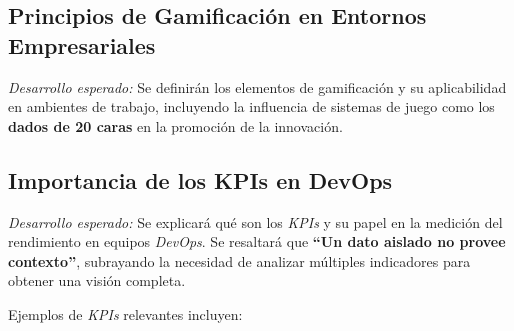 \documentclass[journal]{IEEEtran}
\begin{document}
\subsection{\textbf{Principios de Gamificación en Entornos Empresariales}}

\textit{Desarrollo esperado:} Se definirán los elementos de gamificación y su aplicabilidad en ambientes de trabajo, incluyendo la influencia de sistemas de juego como los \textbf{dados de 20 caras} en la promoción de la innovación.

\subsection{\textbf{Importancia de los KPIs en DevOps}}

\textit{Desarrollo esperado:} Se explicará qué son los \textit{KPIs} y su papel en la medición del rendimiento en equipos \textit{DevOps}. Se resaltará que \textbf{``Un dato aislado no provee contexto''}, subrayando la necesidad de analizar múltiples indicadores para obtener una visión completa.

Ejemplos de \textit{KPIs} relevantes incluyen:
\end{document}
